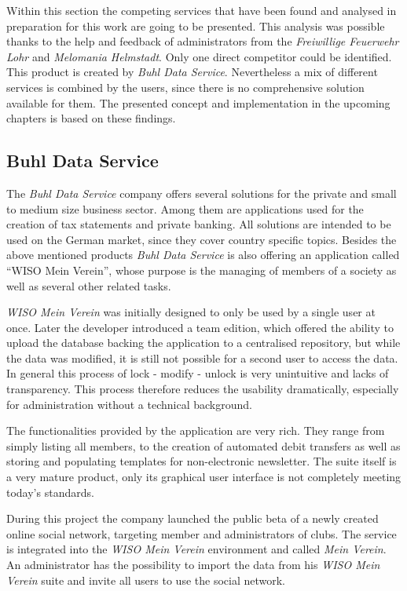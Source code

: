 Within this section the competing services that have been found and analysed in preparation for this work are going to be presented. This analysis was possible thanks to the help and feedback of administrators from the \emph{Freiwillige Feuerwehr Lohr} and \emph{Melomania Helmstadt}. Only one direct competitor could be identified. This product is created by \emph{Buhl Data Service}. Nevertheless a mix of different services is combined by the users, since there is no comprehensive solution available for them. The presented concept and implementation in the upcoming chapters is based on these findings.

\subsection{Buhl Data Service}

The \emph{Buhl Data Service} company offers several solutions for the private and small to medium size business sector. Among them are applications used for the creation of tax statements and private banking. All solutions are intended to be used on the German market, since they cover country specific topics. Besides the above mentioned products \emph{Buhl Data Service} is also offering an application called \enquote{WISO Mein Verein}, whose purpose is the managing of members of a society as well as several other related tasks.

\emph{WISO Mein Verein} was initially designed to only be used by a single user at once. Later the developer introduced a team edition, which offered the ability to upload the database backing the application to a centralised repository, but while the data was modified, it is still not possible for a second user to access the data. In general this process of lock - modify - unlock is very unintuitive and lacks of transparency. This process therefore reduces the usability dramatically, especially for administration without a technical background.

The functionalities provided by the application are very rich. They range from simply listing all members, to the creation of automated debit transfers as well as storing and populating templates for non-electronic newsletter. The suite itself is a very mature product, only its graphical user interface is not completely meeting today's standards. 

During this project the company launched the public beta of a newly created online social network, targeting member and administrators of clubs. The service is integrated into the \emph{WISO Mein Verein} environment and called \emph{Mein Verein}. An administrator has the possibility to import the data from his \emph{WISO Mein Verein} suite and invite all users to use the social network. 

